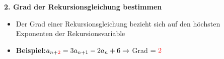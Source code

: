 \textbf{2. Grad der Rekursionsgleichung bestimmen}

\begin{itemize}
\item Der Grad einer Rekursionsgleichung bezieht sich auf den höchsten Exponenten der Rekursionsvariable
\item \textbf{Beispiel:}$a_{n+{\color{red}2}} = 3a_{n+1} - 2a_n + 6 \rightarrow$ Grad $= {\color{red}2}$
\end{itemize}






